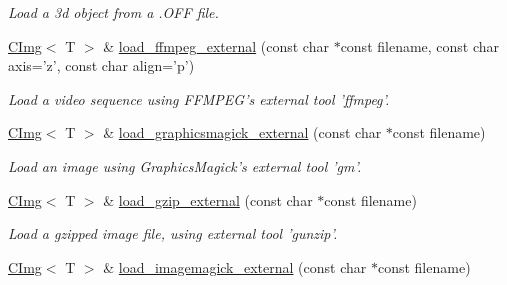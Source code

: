 \begin{DoxyCompactItemize}
\begin{DoxyCompactList}\small\item\em Load a 3d object from a .OFF file. \item\end{DoxyCompactList}\item 
\hypertarget{structcimg__library_1_1CImg_aa2bb0602f254824530b888266d4d503a}{
\hyperlink{structcimg__library_1_1CImg}{CImg}$<$ T $>$ \& \hyperlink{structcimg__library_1_1CImg_aa2bb0602f254824530b888266d4d503a}{load\_\-ffmpeg\_\-external} (const char $\ast$const filename, const char axis='z', const char align='p')}
\label{structcimg__library_1_1CImg_aa2bb0602f254824530b888266d4d503a}

\begin{DoxyCompactList}\small\item\em Load a video sequence using FFMPEG's external tool 'ffmpeg'. \item\end{DoxyCompactList}\item 
\hypertarget{structcimg__library_1_1CImg_aad5a1ff332f904a39b3ea2035d3a94dc}{
\hyperlink{structcimg__library_1_1CImg}{CImg}$<$ T $>$ \& \hyperlink{structcimg__library_1_1CImg_aad5a1ff332f904a39b3ea2035d3a94dc}{load\_\-graphicsmagick\_\-external} (const char $\ast$const filename)}
\label{structcimg__library_1_1CImg_aad5a1ff332f904a39b3ea2035d3a94dc}

\begin{DoxyCompactList}\small\item\em Load an image using GraphicsMagick's external tool 'gm'. \item\end{DoxyCompactList}\item 
\hypertarget{structcimg__library_1_1CImg_a1b8bf7e0b1371dbdc0d845a39f6451a8}{
\hyperlink{structcimg__library_1_1CImg}{CImg}$<$ T $>$ \& \hyperlink{structcimg__library_1_1CImg_a1b8bf7e0b1371dbdc0d845a39f6451a8}{load\_\-gzip\_\-external} (const char $\ast$const filename)}
\label{structcimg__library_1_1CImg_a1b8bf7e0b1371dbdc0d845a39f6451a8}

\begin{DoxyCompactList}\small\item\em Load a gzipped image file, using external tool 'gunzip'. \item\end{DoxyCompactList}\item 
\hypertarget{structcimg__library_1_1CImg_a841db22435a4f77bf3e4c9fc65ecbb6e}{
\hyperlink{structcimg__library_1_1CImg}{CImg}$<$ T $>$ \& \hyperlink{structcimg__library_1_1CImg_a841db22435a4f77bf3e4c9fc65ecbb6e}{load\_\-imagemagick\_\-external} (const char $\ast$const filename)}
\label{structcimg__library_1_1CImg_a841db22435a4f77bf3e4c9fc65ecbb6e}


\end{DoxyCompactItemize}
